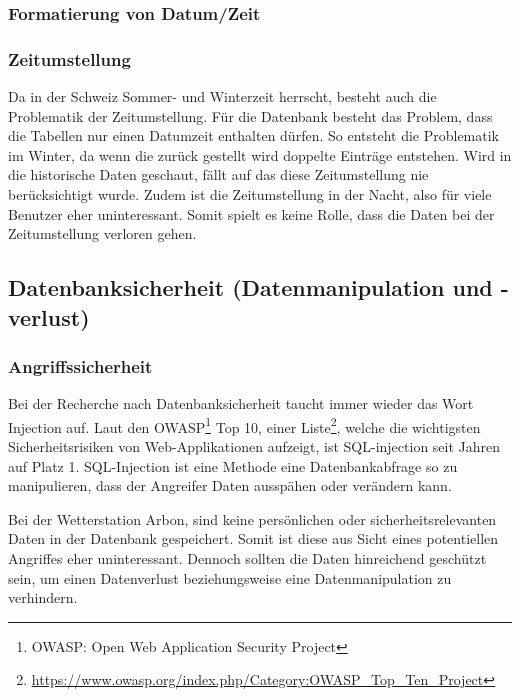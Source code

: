 \subsubsection{Formatierung von Datum/Zeit}

\subsubsection{Zeitumstellung}
Da in der Schweiz Sommer- und Winterzeit herrscht, besteht auch die Problematik der Zeitumstellung. Für die Datenbank besteht das Problem, dass die Tabellen nur einen Datumzeit enthalten dürfen. So entsteht die Problematik im Winter, da wenn die zurück gestellt wird doppelte Einträge entstehen. Wird in die historische Daten geschaut, fällt auf das diese Zeitumstellung nie berücksichtigt wurde. Zudem ist die Zeitumstellung in der Nacht, also für viele Benutzer eher uninteressant. Somit spielt es keine Rolle, dass die Daten bei der Zeitumstellung verloren gehen.




\subsection{Datenbanksicherheit (Datenmanipulation und -verlust)}


\subsubsection{Angriffssicherheit}
Bei der Recherche nach Datenbanksicherheit taucht immer wieder das Wort Injection auf. Laut den OWASP\footnote{OWASP: Open Web Application Security Project} Top 10, einer Liste\footnote{ \url{https://www.owasp.org/index.php/Category:OWASP_Top_Ten_Project}}, welche die wichtigsten Sicherheitsrisiken von Web-Applikationen aufzeigt, ist SQL-injection seit Jahren auf Platz 1. SQL-Injection ist eine Methode eine Datenbankabfrage so zu manipulieren, dass der Angreifer Daten ausspähen oder verändern kann.

Bei der Wetterstation Arbon, sind keine persönlichen oder sicherheitsrelevanten Daten in der Datenbank gespeichert. Somit ist diese aus Sicht eines potentiellen Angriffes eher uninteressant. Dennoch sollten die Daten hinreichend geschützt sein, um einen Datenverlust beziehungsweise eine Datenmanipulation zu verhindern.

